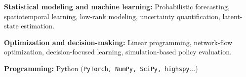 
\textbf{Statistical modeling and machine learning:}
Probabilistic forecasting, spatiotemporal learning,
low-rank modeling, uncertainty quantification,
latent-state estimation.

\textbf{Optimization and decision-making:}
Linear programming, network-flow optimization,
decision-focused learning, simulation-based policy evaluation.

\textbf{Programming:}
Python (\texttt{PyTorch, NumPy, SciPy, highspy}...)

